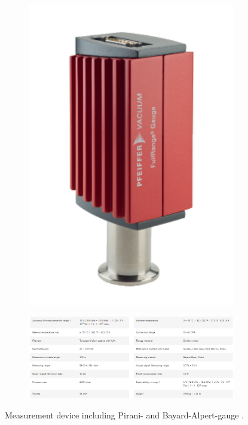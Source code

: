 \begin{figure}[H]
    \centering
    \begin{subfigure}[b]{0.2\textwidth}
        \centering
        \includegraphics[width=1\textwidth]{sections/imges/vacuum_vessel/Pirani_Bayard_Alpert.PNG}
        \subcaption{}
        \label{fig:Pirani}
    \end{subfigure}
    \hfil
    \begin{subfigure}[b]{0.7\textwidth}
        \centering
        \includegraphics[width=1\textwidth]{sections/imges/vacuum_vessel/Pirani_Bayard_Alpert_technical_data.PNG}
        \subcaption{}
        \label{fig:Pirani_technical_data}
    \end{subfigure}
    \caption{Measurement device including Pirani- and Bayard-Alpert-gauge \cite{pfeifferdruck}.}
    \label{fig:Pirani_Bayard_alpert_ALL}
\end{figure}


